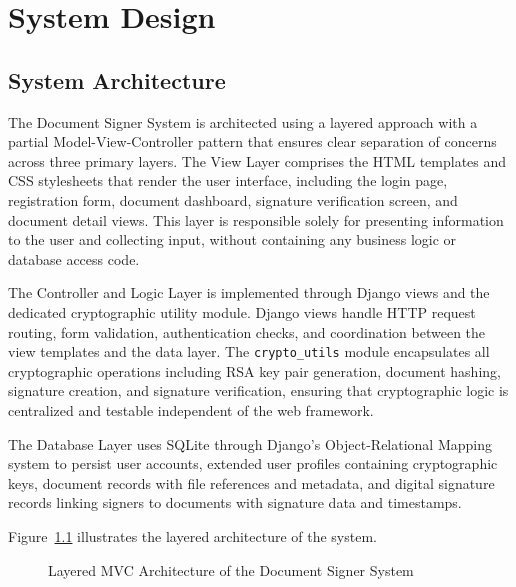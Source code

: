 \chapter{System Design}

\section{System Architecture}

The Document Signer System is architected using a layered approach with a partial Model-View-Controller pattern that ensures clear separation of concerns across three primary layers. The View Layer comprises the HTML templates and CSS stylesheets that render the user interface, including the login page, registration form, document dashboard, signature verification screen, and document detail views. This layer is responsible solely for presenting information to the user and collecting input, without containing any business logic or database access code.

The Controller and Logic Layer is implemented through Django views and the dedicated cryptographic utility module. Django views handle HTTP request routing, form validation, authentication checks, and coordination between the view templates and the data layer. The \texttt{crypto\_utils} module encapsulates all cryptographic operations including RSA key pair generation, document hashing, signature creation, and signature verification, ensuring that cryptographic logic is centralized and testable independent of the web framework.

The Database Layer uses SQLite through Django's Object-Relational Mapping system to persist user accounts, extended user profiles containing cryptographic keys, document records with file references and metadata, and digital signature records linking signers to documents with signature data and timestamps.

Figure~\ref{fig:architecture} illustrates the layered architecture of the system.

\begin{figure}[H]
\centering
{}
\caption{Layered MVC Architecture of the Document Signer System}
\label{fig:architecture}
\end{figure}

